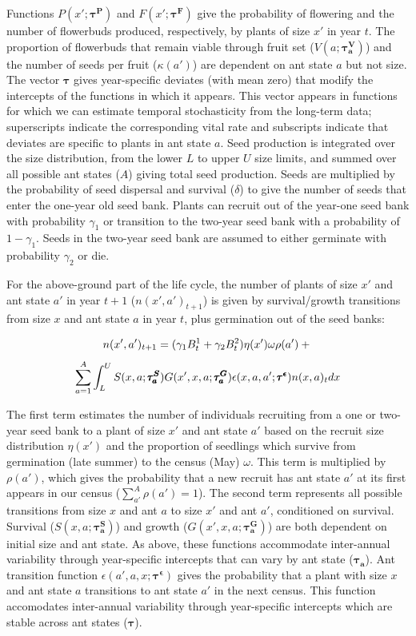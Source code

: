 \documentclass[11pt]{article}
\begin{document}
Functions $P(x';\pmb{\tau^P})$ and $F(x';\pmb{\tau^F})$ give the probability of flowering and the number of flowerbuds produced, respectively, by plants of size $x'$ in year $t$. 
The proportion of flowerbuds that remain viable through fruit set ($V(a;\pmb{\tau^V_{a}})$) and the number of seeds per fruit ($\kappa(a')$) are dependent on ant state $a$ but not size. 
The vector $\pmb{\tau}$ gives year-specific deviates (with mean zero) that modify the intercepts of the functions in which it appears. 
This vector appears in functions for which we can estimate temporal stochasticity from the long-term data; superscripts indicate the corresponding vital rate and subscripts indicate that deviates are specific to plants in ant state $a$. 
Seed production is integrated over the size distribution, from the lower $L$ to upper $U$ size limits, and summed over all possible ant states ($A$) giving total seed production. 
Seeds are multiplied by the probability of seed dispersal and survival ($\delta$) to give the number of seeds that enter the one-year old seed bank. 
Plants can recruit out of the year-one seed bank with probability $\gamma_1$ or transition to the two-year seed bank with a probability of $1 - \gamma_1$. 
Seeds in the two-year seed bank are assumed to either germinate with probability $\gamma_2$ or die. 

For the above-ground part of the life cycle, the number of plants of size $x'$ and ant state $a'$ in year $t+1$ ($n(x',a')_{t+1}$) is given by survival/growth transitions from size $x$ and ant state $a$ in year $t$, plus germination out of the seed banks:
\begin{linenomath*}
	$$
	n(x',a')_{t+1} = (\gamma_1 B^1_{t} + \gamma_2 B^2_{t} ) \eta(x') \omega \rho(a')  + \\
	$$
	$$
	\sum_{a=1}^{A} \int_L^U S(x,a;\pmb{\tau^S_{a}}) G(x',x,a;\pmb{\tau^G_{a}}) \epsilon(x,a,a';\pmb{\tau^{\epsilon}}) n(x,a)_t dx \\
	$$
\end{linenomath*}

The first term estimates the number of individuals recruiting from a one or two-year seed bank to a plant of size $x'$ and ant state $a'$ based on the recruit size distribution $\eta(x')$ and the proportion of seedlings which survive from germination (late summer) to the census (May) $\omega$.
This term is multiplied by $\rho(a')$, which gives the probability that a new recruit has ant state $a'$ at its first appears in our census ($\sum_{a'}^{A}\rho(a')=1$). 
The second term represents all possible transitions from size $x$ and ant $a$ to size $x'$ and ant $a'$, conditioned on survival. 
Survival ($S(x,a;\pmb{\tau^S_{a}})$) and growth ($G(x',x,a;\pmb{\tau^G_{a}})$) are both dependent on initial size and ant state. 
As above, these functions accommodate inter-annual variability through year-specific intercepts that can vary by ant state ($\pmb{\tau_{a}}$). 
Ant transition function $\epsilon(a',a,x;\pmb{\tau^{\epsilon}})$ gives the probability that a plant with size $x$ and ant state $a$ transitions to ant state $a'$ in the next census. 
This function accomodates inter-annual variability through year-specific intercepts which are stable across ant states ($\pmb{\tau}$).
\end{document}
